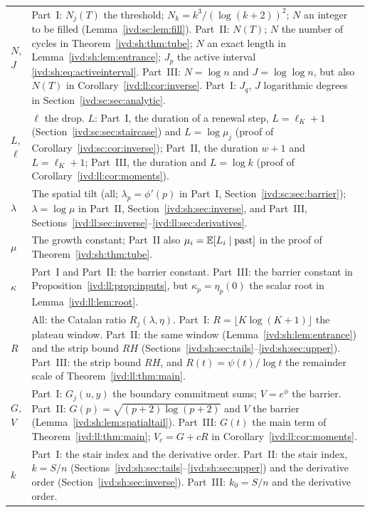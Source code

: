 \documentclass[11pt,letterpaper]{article}
\theoremstyle{remark}\newtheorem{remark}[theorem]{Remark}
\numberwithin{equation}{section}
\begin{document}
\begin{longtable}{@{}>{\raggedright\arraybackslash}p{} >{\raggedright\arraybackslash}p{}@{}}
$N$, $J$ & Part~I: $N_j(T)$ the threshold; $N_k=k^3/(\log(k+2))^2$; $N$ an integer to be filled (Lemma~\ref{ivd:sc:lem:fill}). Part~II: $N(T)$; $N$ the number of cycles in Theorem~\ref{ivd:sh:thm:tube}; $N$ an exact length in Lemma~\ref{ivd:sh:lem:entrance}; $J_p$ the active interval \eqref{ivd:sh:eq:activeinterval}. Part~III: $N=\log n$ and $J=\log\log n$, but also $N(T)$ in Corollary~\ref{ivd:ll:cor:inverse}. Part~I: $J_q$, $J$ logarithmic degrees in Section~\ref{ivd:sc:sec:analytic}.\\
$L$, $\ell$ & $\ell$ the drop. $L$: Part~I, the duration of a renewal step, $L=\ell_K+1$ (Section~\ref{ivd:sc:sec:staircase}) and $L=\log\mu_j$ (proof of Corollary~\ref{ivd:sc:cor:inverse}); Part~II, the duration $w+1$ and $L=\ell_K+1$; Part~III, the duration and $L=\log k$ (proof of Corollary~\ref{ivd:ll:cor:moments}).\\
$\lambda$ & The spatial tilt (all; $\lambda_p=\phi'(p)$ in Part~I, Section~\ref{ivd:sc:sec:barrier}); $\lambda=\log\mu$ in Part~II, Section~\ref{ivd:sh:sec:inverse}, and Part~III, Sections~\ref{ivd:ll:sec:inverse}--\ref{ivd:ll:sec:derivatives}.\\
$\mu$ & The growth constant; Part~II also $\mu_i=\mathbb E[L_i\mid\text{past}]$ in the proof of Theorem~\ref{ivd:sh:thm:tube}.\\
$\kappa$ & Part~I and Part~II: the barrier constant. Part~III: the barrier constant in Proposition~\ref{ivd:ll:prop:inputs}, but $\kappa_p=\eta_p(0)$ the scalar root in Lemma~\ref{ivd:ll:lem:root}.\\
$R$ & All: the Catalan ratio $R_j(\lambda,\eta)$. Part~I: $R=\lfloor K\log(K+1)\rfloor$ the plateau window. Part~II: the same window (Lemma~\ref{ivd:sh:lem:entrance}) and the strip bound $RH$ (Sections~\ref{ivd:sh:sec:tails}--\ref{ivd:sh:sec:upper}). Part~III: the strip bound $RH$, and $R(t)=\psi(t)/\log t$ the remainder scale of Theorem~\ref{ivd:ll:thm:main}.\\
$G$, $V$ & Part~I: $G_j(u,y)$ the boundary commitment sums; $V=e^\phi$ the barrier. Part~II: $G(p)=\sqrt{(p+2)\log(p+2)}$ and $V$ the barrier (Lemma~\ref{ivd:sh:lem:spatialtail}). Part~III: $G(t)$ the main term of Theorem~\ref{ivd:ll:thm:main}; $V_c=G+cR$ in Corollary~\ref{ivd:ll:cor:moments}.\\
$k$ & Part~I: the stair index and the derivative order. Part~II: the stair index, $k=S/n$ (Sections~\ref{ivd:sh:sec:tails}--\ref{ivd:sh:sec:upper}) and the derivative order (Section~\ref{ivd:sh:sec:inverse}). Part~III: $k_0=S/n$ and the derivative order.\\

\end{longtable}
\end{document}
